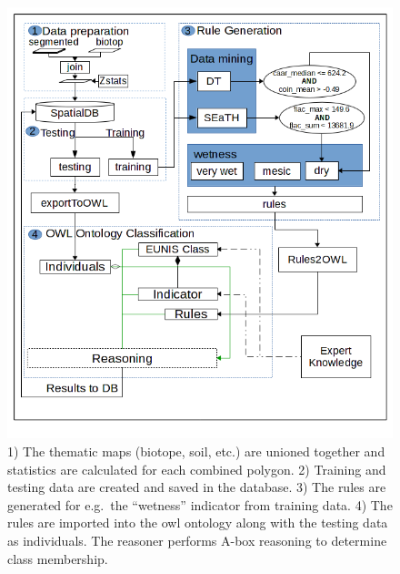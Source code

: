 \documentclass[authoryear,preprint,12pt,number]{elsarticle}
\begin{document}
\begin{figure}
\includegraphics[width=1\linewidth]{diagrams/final_workflow_diagram.png}
\caption
    {
        1) The thematic maps (biotope, soil, etc.) are unioned together and
        statistics are calculated for each combined polygon.
        2) Training and testing data are created and saved in the database.
        3) The rules are generated for e.g.\ the ``wetness'' indicator from
        training data.
        4) The rules are imported into the \gls{owl} ontology along with the 
testing
        data as individuals. The reasoner performs A-box reasoning to determine
        class membership.
    \label{fig:full_workflow}}
\end{figure}
\label{subsec:reference_data_and_semantic_characterisation} 
\end{document}
